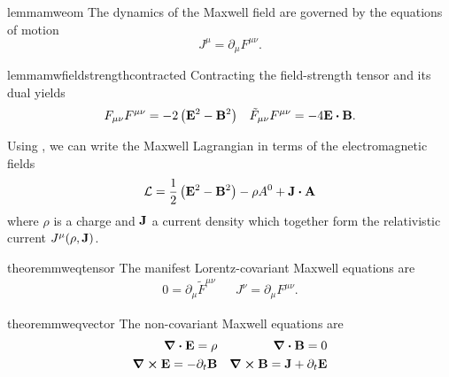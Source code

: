 \begin{restatable}{lemma}{mweom}\label{thm:mw_eom}
	The dynamics of the Maxwell field are governed by the equations of motion
	\begin{equation}
		J^\mu
		=
		\partial_\mu
		F^{\mu\nu}
		\label{eq:mw_eom}
		.
	\end{equation}
\end{restatable}
\begin{restatable}{lemma}{mwfieldstrengthcontracted}\label{thm:mw_field_strength_contracted}
	Contracting the field-strength tensor and its dual yields
		\begin{align}
		F_{\mu\nu}
		F^{\mu\nu}
		=
		-2
		\left(
			\vb{E}^2
			-
			\vb{B}^2
		\right)
		&&
		\tilde{F}_{\mu\nu}
		F^{\mu\nu}
		=
		-
		4
		\vb{E}
		\vdot
		\vb{B}
		.
	\end{align}
\end{restatable}
\begin{corollary}
	Using , we can write the Maxwell Lagrangian in terms of the electromagnetic fields
	\begin{equation}
		\mathcal{L}
		=
		\frac{1}{2}
		\left(
			\vb{E}^2
			-
			\vb{B}^2
		\right)
		-
		\rho A^0
		+
		\vb{J}\vdot\vb{A}
	\end{equation}
	where $\rho$ is a charge and $\vb{J}$ a current density which together form the relativistic current $J^\mu(\rho,\vb{J})$.
\end{corollary}

\begin{restatable}{theorem}{mweqtensor}\label{thm:tensor_maxwell}
	The manifest Lorentz-covariant Maxwell equations are
	\begin{align}
		0
		=
		\partial_\mu
		\tilde{F}^{\mu\nu}
		&&
		J^\nu
		=
		\partial_\mu
		F^{\mu\nu}
		\label{eq:tensor_maxwell}.
	\end{align}
\end{restatable}
\begin{restatable}{theorem}{mweqvector}\label{thm:vector_maxwell}
	The non-covariant Maxwell equations are
	\begin{align}
		\div\vb{E}
		=
		\rho
		&&
		\div\vb{B}
		=
		0
		\label{eq:vector_maxwell_homo}
		\\
		\curl\vb{E}
		=
		-
		\partial_t\vb{B}
		&&
		\curl\vb{B}
		=
		\vb{J}
		+
		\partial_t\vb{E}
		\label{eq:vector_maxwell_inhomo}
	\end{align}
\end{restatable}

